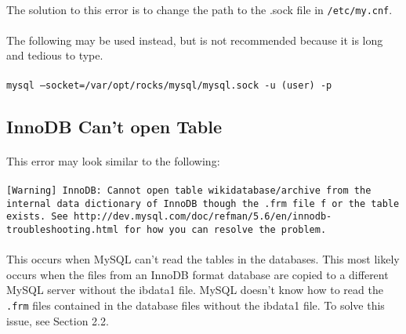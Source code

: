\documentclass[12pt]{article}
\begin{document}
\paragraph{}The solution to this error is to change the path to the .sock file in {\tt/etc/my.cnf}.
\paragraph{}The following may be used instead, but is not recommended because it is long and tedious to type.
\paragraph{}{\tt mysql --socket=/var/opt/rocks/mysql/mysql.sock  -u (user) -p}

\subsection{InnoDB Can't open Table}
\paragraph{} This error may look similar to the following:
\paragraph{}{\tt [Warning] InnoDB: Cannot open table wikidatabase/archive from the internal data dictionary of InnoDB though the .frm file f\
  or the table exists. See http://dev.mysql.com/doc/refman/5.6/en/innodb-
  troubleshooting.html for how you can resolve the problem.}
\paragraph{}This occurs when MySQL can't read the tables in the databases. This most likely occurs when the files from an InnoDB format database are copied to a different MySQL server without the ibdata1 file. MySQL doesn't know how to read the {\tt.frm} files contained in the database files without the ibdata1 file. To solve this issue, see Section 2.2.
\end{document}
